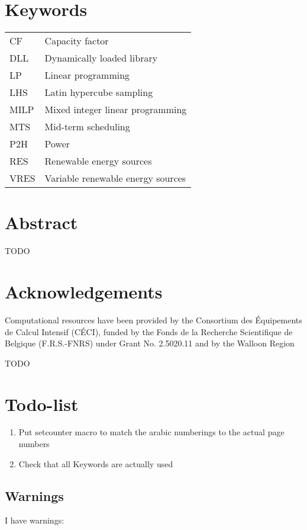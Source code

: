 \section*{Keywords}

\begin{table}[h!]
    \begin{tabular}{p{3cm} p{8cm}}
        CF & Capacity factor \\
        DLL & Dynamically loaded library \\
        LP & Linear programming \\
        LHS & Latin hypercube sampling \\
        MILP & Mixed integer linear programming \\
        MTS & Mid-term scheduling \\
        P2H & Power \\
        RES & Renewable energy sources \\
        VRES & Variable renewable energy sources \\
    \end{tabular}
\end{table}

\newpage

\section*{Abstract}

TODO


\section*{Acknowledgements}

Computational resources have been provided by the Consortium des Équipements de Calcul Intensif (CÉCI), funded by the Fonds de la Recherche Scientifique de Belgique (F.R.S.-FNRS) under Grant No. 2.5020.11 and by the Walloon Region

TODO

\section*{Todo-list}
\begin{enumerate}
    \item Put setcounter macro to match the arabic numberings to the actual page numbers
    \item Check that all Keywords are actually used
\end{enumerate}

\newpage

\tableofcontents

\subsection*{Warnings}

I have  warnings:
\begin{itemize}
    \mylistwarnings{\item}
\end{itemize}

\newpage